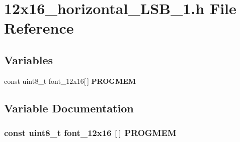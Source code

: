 \section{12x16\_\-horizontal\_\-LSB\_\-1.h File Reference}
\label{12x16__horizontal__LSB__1_8h}
\subsection*{Variables}
\begin{CompactItemize}
\item 
const uint8\_\-t font\_\-12x16[$\,$] {\bf PROGMEM}
\end{CompactItemize}


\subsection{Variable Documentation}
\subsubsection{\setlength{\rightskip}{0pt plus 5cm}const uint8\_\-t font\_\-12x16 [$\,$] {\bf PROGMEM}}\label{12x16__horizontal__LSB__1_8h_f0367e5a8f2e1931348909f7875e3236}


